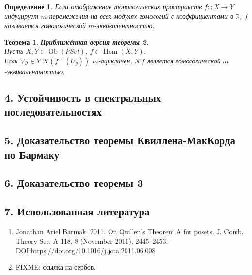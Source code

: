 \documentclass[a4paper,12pt]{report}
\newtheorem{theorem}{Теорема}
\newtheorem{definition}{Определение}
\begin{document}
\begin{definition}
  Если отображение топологических пространств $f :: X \to Y$ индуцирует $m$-перемежения на всех модулях гомологий с коэффициентами в $\mathbb{R}$, $f$ называется гомологической $m$-эквивалентностью.
\end{definition}
\begin{theorem}
  \textbf{Приближённая версия теоремы 2.}\\
  Пусть $X, Y \in \operatorname{Ob}(PSet)$, $f \in \operatorname{Hom}(X,Y)$.\\
  Если $\forall y \in Y\;\mathcal{K}(f^{-1}(U_y))$ $m$-ацикличен, $\mathcal{K}f$ является гомологической $m$-эквивалентностью.\\
\end{theorem}
\subsection*{4. Устойчивость в спектральных последовательностях}

\subsection*{5. Доказательство теоремы Квиллена-МакКорда по Бармаку}

\subsection*{6. Доказательство теоремы 3}

\subsection*{7. Использованная литература}
\begin{enumerate}
  \item Jonathan Ariel Barmak. 2011. On Quillen’s Theorem A for posets. J. Comb. Theory Ser. A 118, 8 (November 2011), 2445–2453. DOI:https://doi.org/10.1016/j.jcta.2011.06.008
  \item FIXME: ссылка на сербов.
\end{enumerate}
\end{document}
